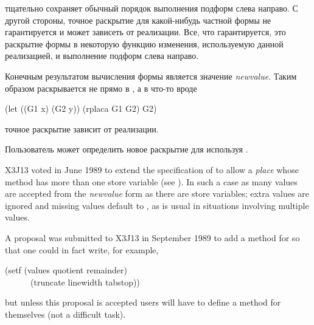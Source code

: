 \begin{defmac}
 тщательно сохраняет обычный порядок выполнения подформ слева
направо.
С другой стороны, точное раскрытие для какой-нибудь частной формы не
гарантируется и может зависеть от реализации. Все, что гарантируется, это 
раскрытие  формы в некоторую функцию изменения, используемую данной
реализацией, и выполнение подформ слева направо.

Конечным результатом вычисления формы  является значение
\emph{newvalue}. Таким образом  раскрывается не прямо в
, а в что-то вроде
\begin{lisp}
(let ((G1 x) (G2 y)) (rplaca G1 G2) G2)
\end{lisp}
точное раскрытие зависит от реализации.

Пользователь может определить новое раскрытие для  используя
.

\begin{newer}
X3J13 voted in June 1989 
to extend the specification of  to allow a \emph{place}
whose  method has more than one store variable (see ).
In such a case as many values are accepted from the \emph{newvalue} form
as there are store variables; extra values are ignored
and missing values default to ,
as is usual in situations involving multiple values.

A proposal was submitted to X3J13 in September 1989
to add a  method for  so that one could
in fact write, for example,
\begin{lisp}
(setf (values quotient remainder) \\
~~~~~~(truncate linewidth tabstop))
\end{lisp}
but unless this proposal is accepted users will have to
define a  method for  themselves (not a difficult task).
\end{newer}
\end{defmac}

